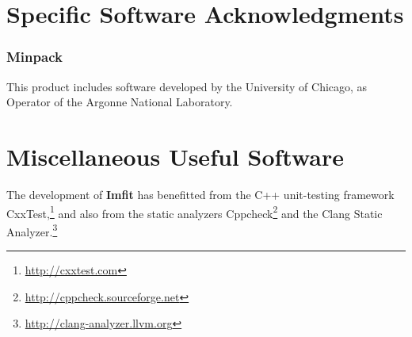 \documentclass[10pt,a4paper,article]{memoir}
\newcommand{\imfit}{\textbf{Imfit}}
\begin{document}
\section{Specific Software Acknowledgments}

\subsubsection{Minpack}
This product includes software developed by the University of Chicago, as Operator of
the Argonne National Laboratory.


\section{Miscellaneous Useful Software}

The development of \imfit{} has benefitted from the C++ unit-testing
framework CxxTest,\footnote{\url{http://cxxtest.com}} and also from the
static analyzers
Cppcheck\footnote{\url{http://cppcheck.sourceforge.net}} and the Clang
Static Analyzer.\footnote{\url{http://clang-analyzer.llvm.org}}




\end{document}
